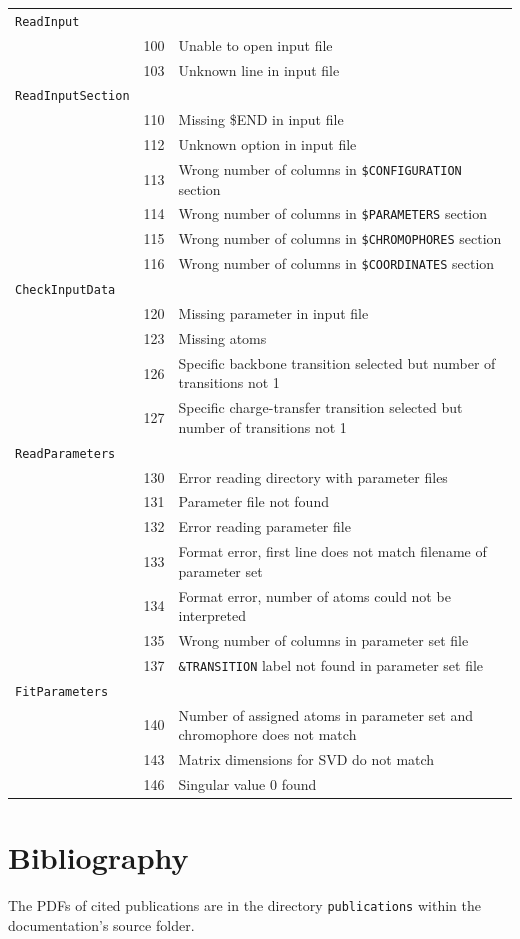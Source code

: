 \documentclass[11pt, letterpaper]{article}
\begin{document}
\begin{tabular}{p{0.5cm}cl}
\verb'ReadInput'  & & \\
&  100  & Unable to open input file  \\
&  103  & Unknown line in input file \\[1em]

\verb'ReadInputSection'  & & \\
&  110  & Missing \$END in input file  \\
&  112  & Unknown option in input file \\
&  113  & Wrong number of columns in \verb'$CONFIGURATION' section \\
&  114  & Wrong number of columns in \verb'$PARAMETERS' section    \\
&  115  & Wrong number of columns in \verb'$CHROMOPHORES' section  \\
&  116  & Wrong number of columns in \verb'$COORDINATES' section   \\[1em]

\verb'CheckInputData' &  & \\
&  120  & Missing parameter in input file \\
&  123  & Missing atoms \\
&  126  & Specific backbone transition selected but number of transitions not 1 \\
&  127  & Specific charge-transfer transition selected but number of transitions not 1 \\[1em]

\verb'ReadParameters' & & \\
&  130  & Error reading directory with parameter files \\
&  131  & Parameter file not found \\
&  132  & Error reading parameter file \\
&  133  & Format error, first line does not match filename of parameter set \\
&  134  & Format error, number of atoms could not be interpreted \\
&  135  & Wrong number of columns in parameter set file \\
&  137  & \verb'&TRANSITION' label not found in parameter set file \\[1em]

\verb'FitParameters' & & \\
&  140  & Number of assigned atoms in parameter set and chromophore does not match \\
&  143  & Matrix dimensions for SVD do not match \\
&  146  & Singular value 0 found \\ 
\end{tabular}




\newpage

\section{Bibliography}

The PDFs of cited publications are in the directory \verb'publications' within the documentation's source folder.



\end{document}

